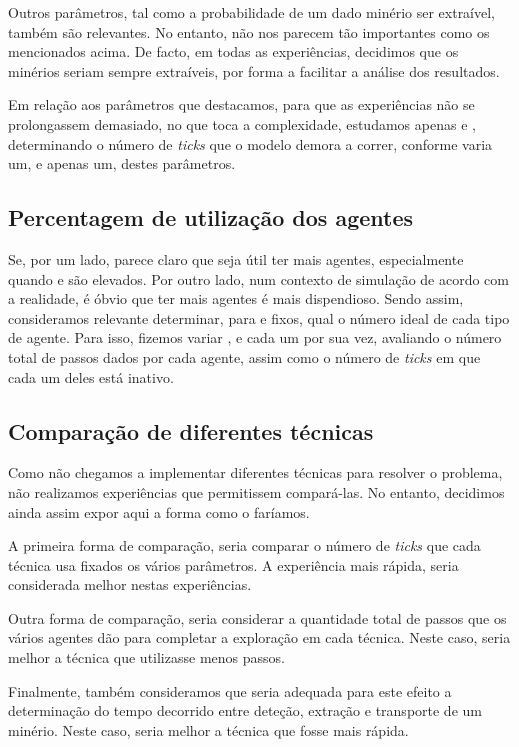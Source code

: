 \documentclass[12pt]{report}
\begin{document}
Outros parâmetros, tal como a probabilidade de um dado minério ser extraível, também são relevantes. No entanto, não nos parecem tão importantes como os mencionados acima. De facto, em todas as experiências, decidimos que os minérios seriam sempre extraíveis, por forma a facilitar a análise dos resultados. 

Em relação aos parâmetros que destacamos, para que as experiências não se prolongassem demasiado, no que toca a complexidade, estudamos apenas \size e \minerals, determinando o número de \emph{ticks} que o modelo demora a correr, conforme varia um, e apenas um, destes parâmetros.

\subsection{Percentagem de utilização dos agentes}

Se, por um lado, parece claro que seja útil ter mais agentes, especialmente quando \size e \minerals são elevados. Por outro lado, num contexto de simulação de acordo com a realidade, é óbvio que ter mais agentes é mais dispendioso. Sendo assim, consideramos relevante determinar, para \size e \minerals fixos, qual o número ideal de cada tipo de agente. Para isso, fizemos variar \spotters, \producers e \transporters cada um por sua vez, avaliando o número total de passos dados por cada agente, assim como o número de \emph{ticks} em que cada um deles está inativo.

\subsection{Comparação de diferentes técnicas}

Como não chegamos a implementar diferentes técnicas para resolver o problema, não realizamos experiências que permitissem compará-las. No entanto, decidimos ainda assim expor aqui a forma como o faríamos.

A primeira forma de comparação, seria comparar o número de \emph{ticks} que cada técnica usa fixados os vários parâmetros. A experiência mais rápida, seria considerada melhor nestas experiências.

Outra forma de comparação, seria considerar a quantidade total de passos que os vários agentes dão para completar a exploração em cada técnica. Neste caso, seria melhor a técnica que utilizasse menos passos.

Finalmente, também consideramos que seria adequada para este efeito a determinação do tempo decorrido entre deteção, extração e transporte de um minério. Neste caso, seria melhor a técnica que fosse mais rápida.
\end{document}
